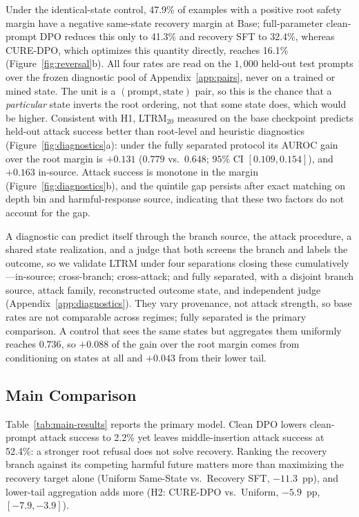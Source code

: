 \documentclass[11pt]{article}
\newcommand{\method}{CURE-DPO}
\newcommand{\ltrm}{LTRM}
\begin{document}
Under the identical-state control, 47.9\% of examples with a positive root
safety margin have a negative same-state recovery margin at Base;
full-parameter clean-prompt DPO reduces this only to 41.3\% and recovery SFT to
32.4\%, whereas \method{}, which optimizes this quantity directly, reaches
16.1\% (Figure~\ref{fig:reversal}b). All four rates are read on the \(1{,}000\)
held-out test prompts over the frozen diagnostic pool of
Appendix~\ref{app:pairs}, never on a trained or mined state. The unit is a
\((\text{prompt},\text{state})\) pair, so this is the chance that a
\emph{particular} state inverts the root ordering, not that some state does,
which would be higher. Consistent with H1, \ltrm{}\(_{20}\) measured on the
base checkpoint predicts held-out attack success better than root-level and
heuristic diagnostics (Figure~\ref{fig:diagnostics}a): under the fully separated
protocol its AUROC gain over the root margin is \(+0.131\) (\(0.779\) vs.\
\(0.648\); \(95\%\) CI \([0.109, 0.154]\)), and \(+0.163\) in-source. Attack
success is monotone in the margin (Figure~\ref{fig:diagnostics}b), and the
quintile gap persists after exact matching on depth bin and harmful-response
source, indicating that these two factors do not account for the gap.

A diagnostic can predict itself through the branch source, the attack procedure,
a shared state realization, and a judge that both screens the branch and labels
the outcome, so we validate \ltrm{} under four separations closing these
cumulatively---in-source; cross-branch; cross-attack; and fully separated, with
a disjoint branch source, attack family, reconstructed outcome state, and
independent judge (Appendix~\ref{app:diagnostics}). They vary provenance, not
attack strength, so base rates are not comparable across regimes; fully
separated is the primary comparison. A control that sees the same states but aggregates
them uniformly reaches \(0.736\), so \(+0.088\) of the gain over the root margin
comes from conditioning on states at all and \(+0.043\) from their lower tail.

\subsection{Main Comparison}
\label{sec:results-main}

Table~\ref{tab:main-results} reports the primary model. Clean DPO lowers
clean-prompt attack success to 2.2\% yet leaves middle-insertion attack success at
52.4\%: a stronger root refusal does not solve recovery. Ranking the recovery
branch against its competing harmful future matters more than maximizing the
recovery target alone (Uniform Same-State vs.\ Recovery SFT, \(-11.3\)~pp), and
lower-tail aggregation adds more (H2: \method{} vs.\ Uniform, \(-5.9\)~pp,
\([-7.9, -3.9]\)).
\end{document}
